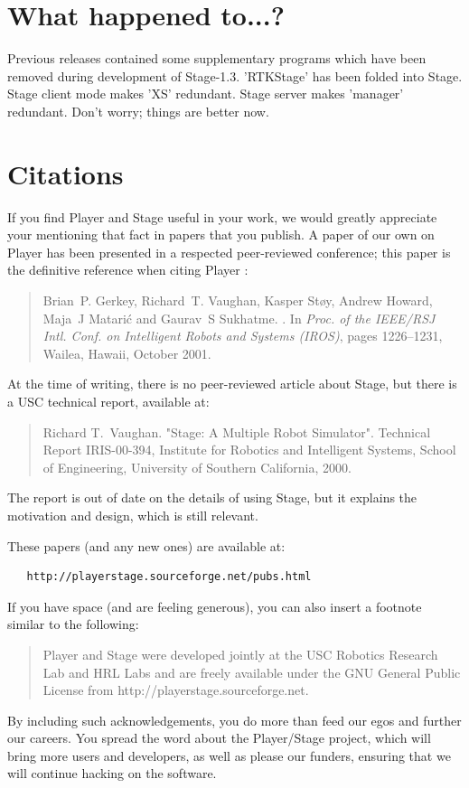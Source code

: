 \documentclass[11pt,twoside]{report}
\def\VERSION {1.3}
\begin{document}
  \section{What happened to...?}
	
	Previous releases contained some supplementary programs which
	have been removed during development of
	Stage-\VERSION. 'RTKStage' has been folded into Stage. Stage
	client mode makes 'XS' redundant. Stage server makes 'manager'
	redundant. Don't worry; things are better now.

\section{Citations}
If you find Player and Stage useful in your work, we would greatly
appreciate your mentioning that fact in papers that you publish.  A
paper of our own on Player has been presented in a respected
peer-reviewed conference; this paper is the definitive reference when
citing Player \cite{GerkeyVaughan01a}:
\begin{quote}
Brian~P. Gerkey, Richard~T. Vaughan, Kasper St\o{}y, Andrew Howard,
Maja~J Matari\'c and Gaurav~S Sukhatme.
.
\newblock In {\em Proc. of the IEEE/RSJ Intl. Conf. on Intelligent Robots and
  Systems (IROS)}, pages 1226--1231, Wailea, Hawaii, October 2001.
\end{quote}

At the time of writing, there is no peer-reviewed article about Stage,
but there is a USC technical report, available at:

\begin{quote}
Richard T.~Vaughan. "Stage: A Multiple Robot Simulator". Technical Report IRIS-00-394, Institute for Robotics and Intelligent Systems, School of Engineering, University of Southern California, 2000.
\end{quote}

The report is out of date on the details of using Stage, but it
explains the motivation and design, which is still relevant.

These papers (and any new ones) are available at: 

\begin{verbatim}
   http://playerstage.sourceforge.net/pubs.html
\end{verbatim}

If you have space (and are feeling generous), you can also insert a footnote
similar to the following:
\begin{quote}
Player and Stage were developed jointly at the USC Robotics Research
Lab and HRL Labs and are freely available under the GNU General Public
License from http://playerstage.sourceforge.net.
\end{quote}
By including such acknowledgements, you do more than feed our egos and
further our careers.  You spread the word about the Player/Stage
project, which will bring more users and developers, as well as please
our funders, ensuring that we will continue hacking on the software.
\end{document}
